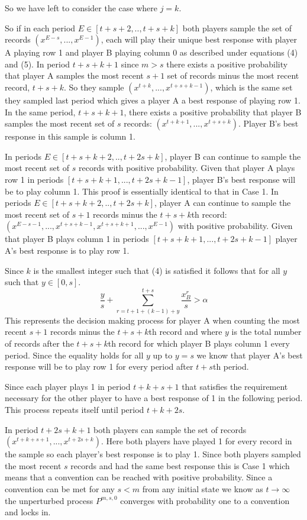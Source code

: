 \documentclass{article}
\begin{document}
So we have left to consider the case where $j=k$.

So if in each period $E \in [t+s+2,..,t+s+k]$ both players sample the set of records $(x^{E-s},...,x^{E-1})$, each will play their unique best response with player A playing row 1 and player B playing column 0 as described under equations (4) and (5). In period $t+s+k+1$ since $m>s$ there exists a positive probability that player A samples the most recent $s+1$ set of records minus the most recent record, $t+s+k$. So they sample $(x^{t+k},...,x^{t+s+k-1})$, which is the same set they sampled last period which gives a player A a best response of playing row 1. In the same period, $t+s+k+1$, there exists a positive probability that player B samples the most recent set of $s$ records: $(x^{t+k+1},...,x^{t+s+k})$. Player B's best response in this sample is column 1.
\vskip6pt

In periods $E \in [t+s+k+2,..,t+2s+k]$, player B can continue to sample the most recent set of $s$ records with positive probability. Given that player A plays row 1 in periods $[t+s+k+1,...,t+2s+k-1]$, player B's best response will be to play column 1. This proof is essentially identical to that in Case 1. In periods $E \in [t+s+k+2,..,t+2s+k]$, player A can continue to sample the most recent set of $s+1$ records minus the $t+s+k$th record: $(x^{E-s-1},...,x^{t+s+k-1},x^{t+s+k+1},...,x^{E-1})$ with positive probability. Given that player B plays column 1 in periods $[t+s+k+1,...,t+2s+k-1]$ player A's best response is to play row 1.

Since $k$ is the smallest integer such that (4) is satisfied it follows that for all $y$ such that $y \in [0,s]$.
$$\frac{y}{s}+\sum\limits_{r=t+1+(k-1)+y}^{t+s} \frac{x^r_B}{s} > \alpha$$
This represents the decision making process for player A when counting the most recent $s+1$ records minus the $t+s+k$th record and where $y$ is the total number of records after the $t+s+k$th record for which player B plays column 1 every period. Since the equality holds for all $y$ up to $y=s$ we know that player A's best response will be to play row 1 for every period after $t+s$th period.

Since each player plays 1 in period $t+k+s+1$ that satisfies the requirement necessary for the other player to have a best response of 1 in the following period. This process repeats itself until period $t+k+2s$. 

In period $t+2s+k+1$ both players can sample the set of records $(x^{t+k+s+1},...,x^{t+2s+k})$. Here both players have played 1 for every record in the sample so each player's best response is to play 1. Since both players sampled the most recent $s$ records and had the same best response this is Case 1 which means that a convention can be reached with positive probability.
\vskip12pt
Since a convention can be met for any $s<m$ from any initial state we know as $t \rightarrow \infty$ the unperturbed process $P^{m,s,0}$ converges with probability one to a convention and locks in.
\end{document}
